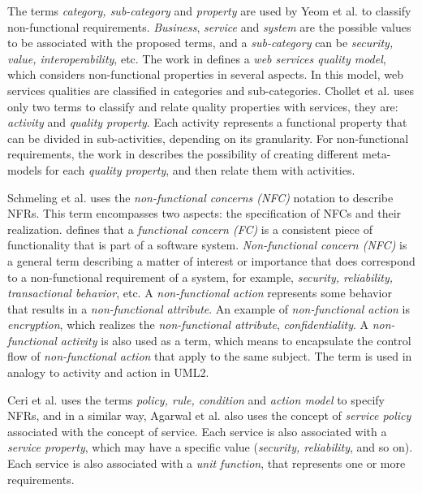 The terms \textit{category, sub-category}
and \textit{property}  are used by Yeom
et al.\cite{Yeom2006} to classify non-functional requirements.
\textit{Business}, \textit{service} and \textit{system} are the possible values to be associated
with the proposed terms, and a \textit{sub-category} can be \textit{security,
value, interoperability}, etc. The work in \cite{Yeom2006} defines a \textit{web
services quality model}, which considers non-functional properties in several
aspects. In this model, web services qualities are classified in categories and
sub-categories. Chollet et al.\cite{CholletL09} uses only two terms to
classify and relate quality properties with services, they are:
\textit{activity} and \textit{quality property}. Each activity represents a
functional property that can be divided in sub-activities, depending on its
granularity. For non-functional requirements, the work in \cite{CholletL09}
describes the possibility of creating different meta-models for each
\textit{quality property}, and then relate them with activities.   


Schmeling et al.\cite{SchmelingCM11} uses the 
\textit{non-functional concerns (NFC)} notation to describe NFRs. This term
encompasses two aspects: the specification of NFCs and their realization.
\cite{SchmelingCM11} defines that a \textit{functional concern (FC)} is a
consistent piece of functionality that is part of a software system.
\textit{Non-functional concern (NFC)} is a general term describing a matter of interest or importance that does correspond
to a non-functional requirement of a system, for example, \textit{security,
reliability, transactional behavior}, etc. A \textit{non-functional action} represents some
behavior that results in a \textit{non-functional attribute}. An example of
\textit{non-functional action} is \textit{encryption}, which realizes the \textit{non-functional attribute},
\textit{confidentiality}. A \textit{non-functional activity} is also used as a
term, which means to encapsulate the control flow of \textit{non-functional
action} that apply to the same subject. The term is used in analogy to activity
and action in UML2.

Ceri et al.\cite{CeriDMF07} uses the terms \textit{policy, rule,
condition} and \textit{action model} to specify NFRs, and in a similar way,
Agarwal et al.\cite{AgarwalLS09} also uses the concept of \textit{service
policy} associated with the concept of service. Each service is also associated
with a \textit{service property}, which may have a specific value
(\textit{security, reliability}, and so on). Each service is also associated
with a \textit{unit function}, that represents one or more
requirements.

